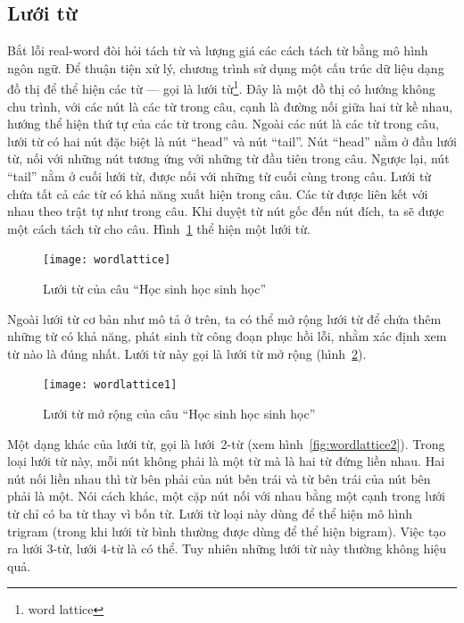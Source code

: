 \documentclass[a4paper,oneside,14pt]{extbook} %
\begin{document}
\subsection{Lưới từ}
\label{sec:wordlattice}

Bắt lỗi real-word đòi hỏi tách từ và lượng giá các cách tách từ bằng
mô hình ngôn ngữ. Để thuận tiện xử lý, chương trình sử dụng một cấu
trúc dữ liệu dạng đồ thị để thể hiện các từ --- gọi là lưới
từ\footnote{word lattice}. Đây là một đồ thị có hướng không chu trình,
với các nút là các từ trong câu, cạnh là đường nối giữa hai từ kề
nhau, hướng thể hiện thứ tự của các từ trong câu. Ngoài các nút là các
từ trong câu, lưới từ có hai nút đặc biệt là nút ``head'' và nút
``tail''. Nút ``head'' nằm ở đầu lưới từ, nối với những nút tương ứng
với những từ đầu tiên trong câu. Ngược lại, nút ``tail'' nằm ở cuối
lưới từ, được nối với những từ cuối cùng trong câu.
Lưới từ chứa tất cả 
các từ có khả năng xuất hiện trong câu. Các từ được liên kết với nhau
theo trật tự như trong câu. Khi duyệt từ nút gốc đến nút đích, ta sẽ
được một cách tách từ cho câu. Hình~\ref{fig:wordlattice} thể hiện một
lưới từ.

\begin{figure}[htbp]
  \centering
  \texttt{[image: wordlattice]}
  \caption{Lưới từ của câu ``Học sinh học sinh học''}
  \label{fig:wordlattice}
\end{figure}

Ngoài lưới từ cơ bản như mô tả ở trên, ta có thể mở rộng lưới từ để
chứa thêm những từ có khả năng, phát sinh từ công đoạn phục hồi lỗi,
nhằm xác định xem từ nào là đúng nhất. Lưới từ này gọi là lưới từ mở
rộng (hình~\ref{fig:wordlattice1}). 

\begin{figure}[htbp]
  \centering
  \texttt{[image: wordlattice1]}
  \caption{Lưới từ mở rộng của câu ``Học sinh học sinh học''}
  \label{fig:wordlattice1}
\end{figure}

Một dạng khác của lưới từ, gọi là lưới~2-từ  (xem
hình~\ref{fig:wordlattice2}). Trong loại lưới từ này, 
mỗi nút không phải là một từ mà là hai từ đứng liền nhau. Hai nút nối
liền nhau thì từ bên phải của nút bên trái và từ bên trái của nút bên
phải là một. Nói cách khác, một cặp nút nối với nhau bằng một cạnh
trong lưới từ chỉ có ba từ thay vì bốn từ. Lưới từ loại này dùng để
thể hiện mô hình trigram (trong khi lưới từ bình thường được dùng để
thể hiện bigram). Việc tạo ra lưới 3-từ, lưới 4-từ là có thể. Tuy
nhiên những lưới từ này thường không hiệu quả. 
\end{document}
